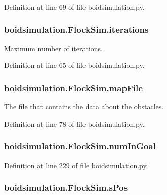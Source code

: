 Definition at line 69 of file boidsimulation.\-py.

\hypertarget{classboidsimulation_1_1FlockSim_a1febd4cacbdcffb5b9d096d4716af78f}{
\subsubsection[{iterations}]{\setlength{\rightskip}{0pt plus 5cm}boidsimulation.\-Flock\-Sim.\-iterations}}\label{classboidsimulation_1_1FlockSim_a1febd4cacbdcffb5b9d096d4716af78f}


Maximum number of iterations. 



Definition at line 65 of file boidsimulation.\-py.

\hypertarget{classboidsimulation_1_1FlockSim_a50b375f7caa0e33d87141d2cde14526f}{
\subsubsection[{map\-File}]{\setlength{\rightskip}{0pt plus 5cm}boidsimulation.\-Flock\-Sim.\-map\-File}}\label{classboidsimulation_1_1FlockSim_a50b375f7caa0e33d87141d2cde14526f}


The file that contains the data about the obstacles. 



Definition at line 78 of file boidsimulation.\-py.

\hypertarget{classboidsimulation_1_1FlockSim_ae60982002b6c8c922b3822dbdec4bd41}{
\subsubsection[{num\-In\-Goal}]{\setlength{\rightskip}{0pt plus 5cm}boidsimulation.\-Flock\-Sim.\-num\-In\-Goal}}\label{classboidsimulation_1_1FlockSim_ae60982002b6c8c922b3822dbdec4bd41}


Definition at line 229 of file boidsimulation.\-py.

\hypertarget{classboidsimulation_1_1FlockSim_a1658c675990b8bdb3955cae1b7292b38}{
\subsubsection[{s\-Pos}]{\setlength{\rightskip}{0pt plus 5cm}boidsimulation.\-Flock\-Sim.\-s\-Pos}}\label{classboidsimulation_1_1FlockSim_a1658c675990b8bdb3955cae1b7292b38}


